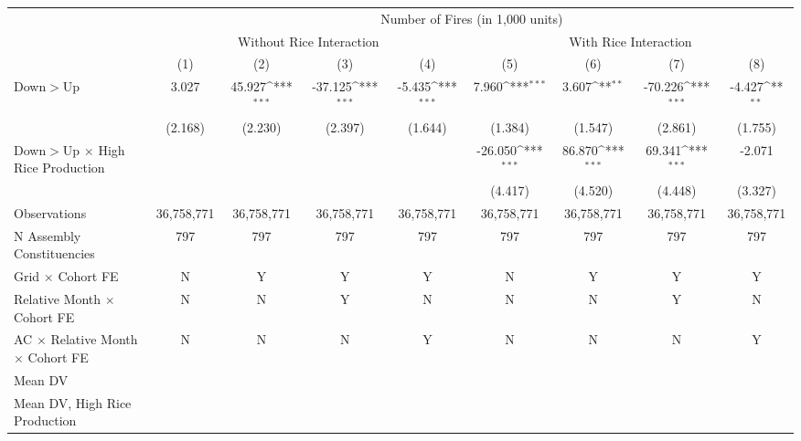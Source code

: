 {\def\sym#1{\ifmmode^{#1}\else\(^{#1}\)\fi}
\begin{tabular}{l*{8}{c}}
\hline
 & \multicolumn{8}{c}{Number of Fires (in 1,000 units)} \\
 & \multicolumn{4}{c}{Without Rice Interaction} & \multicolumn{4}{c}{With Rice Interaction} \\
 & (1) & (2) & (3) & (4) & (5) & (6) & (7) & (8) \\ \hline

Down$>$Up   &       3.027         &      45.927\sym{***}&     -37.125\sym{***}&      -5.435\sym{***}&       7.960\sym{***}&       3.607\sym{**} &     -70.226\sym{***}&      -4.427\sym{**} \\
            &     (2.168)         &     (2.230)         &     (2.397)         &     (1.644)         &     (1.384)         &     (1.547)         &     (2.861)         &     (1.755)         \\
Down$>$Up $\times$ High Rice Production&                     &                     &                     &                     &     -26.050\sym{***}&      86.870\sym{***}&      69.341\sym{***}&      -2.071         \\
            &                     &                     &                     &                     &     (4.417)         &     (4.520)         &     (4.448)         &     (3.327)         \\
\hline
Observations&  36,758,771         &  36,758,771         &  36,758,771         &  36,758,771         &  36,758,771         &  36,758,771         &  36,758,771         &  36,758,771         \\
N Assembly Constituencies&         797         &         797         &         797         &         797         &         797         &         797         &         797         &         797         \\
Grid $\times$ Cohort FE&           N         &           Y         &           Y         &           Y         &           N         &           Y         &           Y         &           Y         \\
Relative Month $\times$ Cohort FE&           N         &           N         &           Y         &           N         &           N         &           N         &           Y         &           N         \\
AC $\times$ Relative Month $\times$ Cohort FE&           N         &           N         &           N         &           Y         &           N         &           N         &           N         &           Y         \\
Mean DV     &                     &                     &                     &                     &                     &                     &                     &                     \\
Mean DV, High Rice Production&                     &                     &                     &                     &                     &                     &                     &                     \\
\hline
\end{tabular}
}
